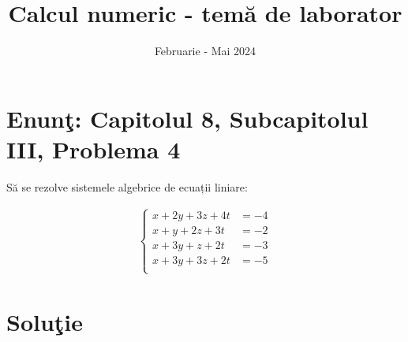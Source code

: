 \documentclass{article}
\begin{document}
\title{Calcul numeric - tem\u{a} de laborator}

\author{}

\date{Februarie - Mai 2024}

\maketitle              %








\section*{Enun\c{t}: Capitolul 8, Subcapitolul III, Problema 4}

S\u{a} se rezolve sistemele algebrice de ecuații liniare:
\begin{center}
\begin{align*}
\begin{cases}
x + 2y + 3z + 4t &= -4 \\
x + y + 2z + 3t &= -2 \\
x + 3y + z + 2t &= -3 \\
x + 3y + 3z + 2t &= -5 \\
 \end{cases}
\end{align*}
\end{center}

\section*{Solu\c{t}ie}
\end{document}
